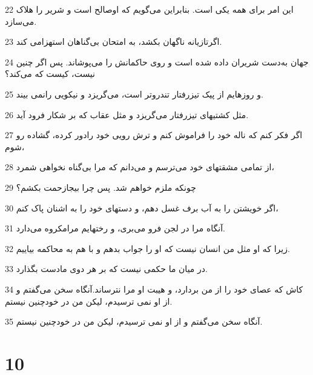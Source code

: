 \par 22 این امر برای همه یکی است. بنابراین می‌گویم که اوصالح است و شریر را هلاک می‌سازد.
\par 23 اگرتازیانه ناگهان بکشد، به امتحان بی‌گناهان استهزامی کند.
\par 24 جهان به‌دست شریران داده شده است و روی حاکمانش را می‌پوشاند. پس اگر چنین نیست، کیست که می‌کند؟
\par 25 و روزهایم از پیک تیزرفتار تندروتر است، می‌گریزد و نیکویی رانمی بیند.
\par 26 مثل کشتیهای تیزرفتار می‌گریزد و مثل عقاب که بر شکار فرود آید.
\par 27 اگر فکر کنم که ناله خود را فراموش کنم و ترش رویی خود رادور کرده، گشاده رو شوم،
\par 28 از تمامی مشقتهای خود می‌ترسم و می‌دانم که مرا بی‌گناه نخواهی شمرد،
\par 29 چونکه ملزم خواهم شد. پس چرا بیجازحمت بکشم؟
\par 30 اگر خویشتن را به آب برف غسل دهم، و دستهای خود را به اشنان پاک کنم،
\par 31 آنگاه مرا در لجن فرو می‌بری، و رختهایم مرامکروه می‌دارد.
\par 32 زیرا که او مثل من انسان نیست که او را جواب بدهم و با هم به محاکمه بیاییم.
\par 33 در میان ما حکمی نیست که بر هر دوی مادست بگذارد.
\par 34 کاش که عصای خود را از من بردارد، و هیبت او مرا نترساند.آنگاه سخن می‌گفتم و از او نمی ترسیدم، لیکن من در خودچنین نیستم.
\par 35 آنگاه سخن می‌گفتم و از او نمی ترسیدم، لیکن من در خودچنین نیستم.
 
\chapter{10}

